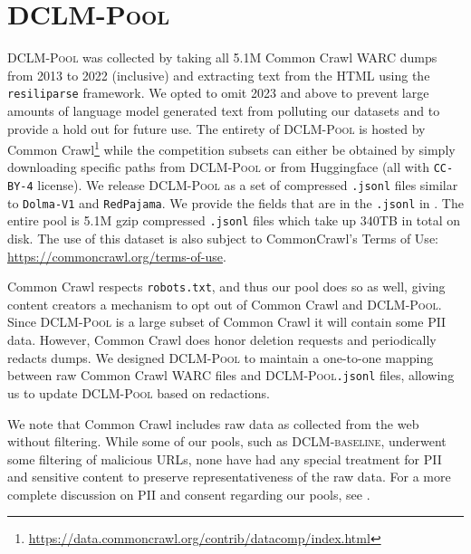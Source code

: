 \documentclass{article}
\newcommand{\rawpool}{\textsc{DCLM-Pool}\xspace}
\newcommand{\hqpool}{\textsc{DCLM-baseline}\xspace}
\newcommand{\rpj}{\texttt{RedPajama}\xspace}
\newcommand{\dolma}{\texttt{Dolma-V1}\xspace}
\newcommand{\resiliparse}{\texttt{resiliparse}\xspace}
\newcommand{\commoncrawl}{Common Crawl\xspace}
\begin{document}
\section{\rawpool}\label{appx:common-pool}
\rawpool was collected by taking all 5.1M \commoncrawl WARC dumps from 2013 to 2022 (inclusive) and extracting text from the HTML using the \resiliparse framework. We opted to omit 2023 and above to prevent large amounts of language model generated text from polluting our datasets and to provide a hold out for future use. The entirety of \rawpool is hosted by Common Crawl\footnote{\url{https://data.commoncrawl.org/contrib/datacomp/index.html}} while the competition subsets can either be obtained by simply downloading specific paths from \rawpool or from Huggingface (all with \verb|CC-BY-4| license). We release \rawpool as a set of compressed \verb|.jsonl| files similar to \dolma and \rpj. We provide the fields that are in the \verb|.jsonl| in . The entire pool is 5.1M gzip compressed \verb|.jsonl| files which take up 340TB in total on disk.
The use of this dataset is also subject to CommonCrawl’s Terms of Use: \url{https://commoncrawl.org/terms-of-use}.

\commoncrawl respects \verb|robots.txt|, and thus our pool does so as well, giving content creators a mechanism to opt out of \commoncrawl and \rawpool.
Since \rawpool is a large subset of \commoncrawl it will contain some PII data. However, \commoncrawl does honor deletion requests and periodically redacts dumps.
We designed \rawpool to maintain a one-to-one mapping between raw \commoncrawl WARC files and \rawpool \verb|.jsonl| files, allowing us to update \rawpool based on redactions.

We note that \commoncrawl includes raw data as collected from the web without filtering. While some of our pools, such as \hqpool, underwent some filtering of malicious URLs, none have had any special treatment for PII and sensitive content to preserve representativeness of the raw data.
For a more complete discussion on PII and consent regarding our pools, see .
\end{document}

